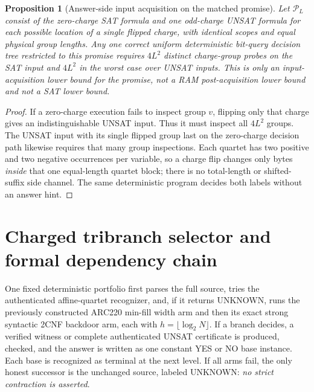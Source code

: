 \documentclass[11pt]{article}
\newtheorem{proposition}[theorem]{Proposition}
\begin{document}
\begin{proposition}[Answer-side input acquisition on the matched promise]
Let $\mathcal P_L$ consist of the zero-charge SAT formula and one odd-charge
UNSAT formula for each possible location of a single flipped charge, with
identical scopes and equal physical group lengths.  Any one correct
uniform deterministic bit-query decision tree restricted to this promise
requires $4L^2$ distinct charge-group probes on the SAT input and
$4L^2$ in the worst case over UNSAT inputs.  This is only an
\emph{input-acquisition} lower bound for the promise, not a RAM
post-acquisition lower bound and not a SAT lower bound.
\end{proposition}
\begin{proof}
If a zero-charge execution fails to inspect group $v$, flipping only that
charge gives an indistinguishable UNSAT input.  Thus it must inspect all
$4L^2$ groups.  The UNSAT input with its single flipped group last on the
zero-charge decision path likewise requires that many group inspections.
Each quartet has two positive and two negative occurrences per variable,
so a charge flip changes only bytes \emph{inside} that one equal-length
quartet block; there is no total-length or shifted-suffix side channel.
The same deterministic program decides both labels without an answer hint.
\end{proof}

\section{Charged tribranch selector and formal dependency chain}
One fixed deterministic portfolio first parses the full source, tries the
authenticated affine-quartet recognizer, and, if it returns UNKNOWN, runs
the previously constructed ARC220 min-fill width arm and then its exact
strong syntactic 2CNF backdoor arm, each with $h=\lfloor\log_2 N\rfloor$.
If a branch decides, a verified witness or complete authenticated UNSAT
certificate is produced, checked, and the answer is written as one constant
YES or NO base instance.  Each base is recognized as terminal at the
next level.  If all arms fail, the only honest successor is the unchanged
source, labeled UNKNOWN: \emph{no strict contraction is asserted}.
\end{document}
